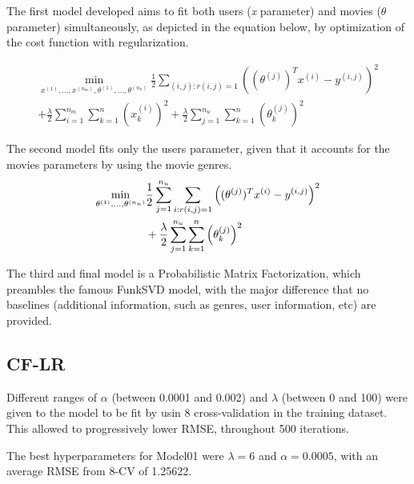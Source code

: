\documentclass[conference]{IEEEtran}
\begin{document}
The first model developed aims to fit both users (\textit{x} parameter) and movies ($\theta$ parameter) simultaneously, as depicted in the equation below, by optimization of the cost function with regularization. %

\begin{multline}
\min_{x^{(1)}, \dots, x^{(n_m)}, \theta^{(1)}, \dots, \theta^{(n_u)}} 
\frac{1}{2} \sum_{(i, j) : r(i, j) = 1} \left( (\theta^{(j)})^T x^{(i)} - y^{(i,j)} \right)^2 \\
+ \frac{\lambda}{2} \sum_{i=1}^{n_m} \sum_{k=1}^{n} \left( x_k^{(i)} \right)^2 + \frac{\lambda}{2} \sum_{j=1}^{n_u} \sum_{k=1}^{n} \left( \theta_k^{(j)} \right)^2
\end{multline}


The second model fits only the users parameter, given that it accounts for the movies parameters by using the movie genres.
\begin{align}
\min_{\theta^{(1)}, \dots, \theta^{(n_u)}} 
&\frac{1}{2} \sum_{j=1}^{n_u} \sum_{i : r(i, j) = 1} \left( (\theta^{(j)})^T x^{(i)} - y^{(i,j)} \right)^2 \notag \\
&+ \frac{\lambda}{2} \sum_{j=1}^{n_u} \sum_{k=1}^{n} \left( \theta_k^{(j)} \right)^2
\end{align}

The third and final model is a Probabilistic Matrix Factorization, which preambles the famous FunkSVD model, with the major difference that no baselines (additional information, such as genres, user information, etc) are provided.

\subsection{CF-LR}

Different ranges of $\alpha$ (between 0.0001 and 0.002) and $\lambda$ (between 0 and 100) were given to the model to be fit by usin 8 cross-validation in the training dataset. This allowed to progressively lower RMSE, throughout 500 iterations.

The best hyperparameters for Model01 were $\lambda = 6$ and $\alpha = 0.0005$, with an average RMSE from 8-CV of 1.25622.
\end{document}

